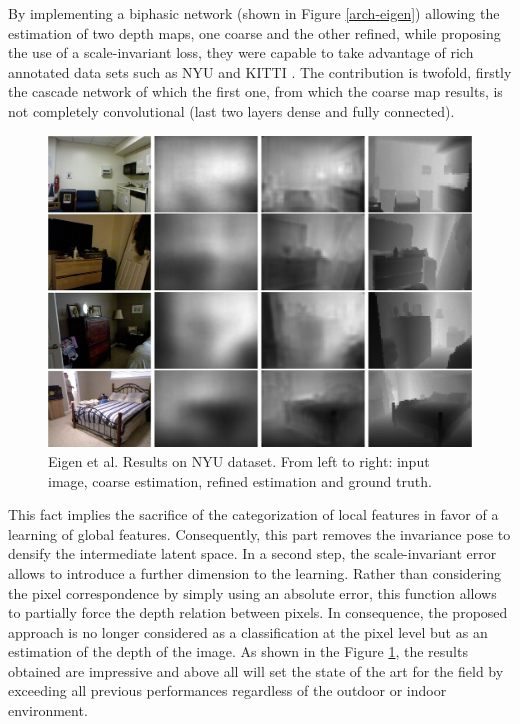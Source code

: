 By implementing a biphasic network (shown in Figure \ref{arch-eigen}) allowing the estimation of two depth maps, one coarse and the other refined, while proposing the use of a scale-invariant loss, they were capable to take advantage of rich annotated data sets such as NYU \cite{SilbermanECCV12} and KITTI \cite{Geiger2012CVPR,Fritsch2013ITSC,Menze2015CVPR}.
The contribution is twofold, firstly the cascade network of which the first one, from which the coarse map results, is not completely convolutional (last two layers dense and fully connected). 


\begin{figure}[h]
	\centering
	\includegraphics[width=0.8\linewidth]{Figures/SOA/ref-eigen}
	\caption[Eigen et al. Results on NYU dataset.]{Eigen et al. Results on NYU dataset. From left to right: input image, coarse estimation, refined estimation and ground truth.}
	\label{ref-eigen}
\end{figure}

This fact implies the sacrifice of the categorization of local features in favor of a learning of global features. Consequently, this part removes the invariance pose to densify the intermediate latent space.
In a second step, the scale-invariant error allows to introduce a further dimension to the learning. Rather than considering the pixel correspondence by simply using an absolute error, this function allows to partially force the depth relation between pixels. In consequence, the proposed approach is no longer considered as a classification at the pixel level but as an estimation of the depth of the image.
As shown in the Figure \ref{ref-eigen}, the results obtained are impressive and above all will set the state of the art for the field by exceeding all previous performances regardless of the outdoor or indoor environment.



